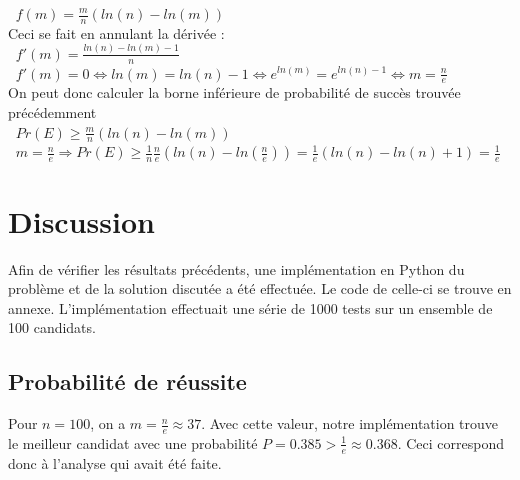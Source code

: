 \documentclass[a4paper,10pt]{article}
\begin{document}
\begin{math}\;\;f(m) = \frac{m}{n} (ln(n) - ln(m))\end{math}\\

Ceci se fait en annulant la dérivée :\\

\begin{math}\;\;f'(m) = \frac{ln(n) - ln(m) - 1}{n}\end{math}\\

\begin{math}\;\;f'(m) = 0 \Leftrightarrow ln(m) = ln(n) - 1\Leftrightarrow e^{ln(m)} = e^{ln(n) - 1}\Leftrightarrow m = \frac{n}{e}\end{math}\\

On peut donc calculer la borne inférieure de probabilité de succès trouvée précédemment\\

\begin{math}\;\; Pr(E) \geq \frac{m}{n} (ln(n) - ln(m))\end{math}\\

\begin{math}\;\; m = \frac{n}{e} \Rightarrow Pr(E) \geq \frac{1}{n} \frac{n}{e}(ln(n) - ln(\frac{n}{e}))
= \frac{1}{e} (ln(n) - ln(n) + 1) = \frac{1}{e}\end{math}\\

\section{Discussion}
Afin de vérifier les résultats précédents, une implémentation en Python du problème et de la solution discutée a été effectuée.
Le code de celle-ci se trouve en annexe. L'implémentation effectuait une série de 1000 tests sur un ensemble de 100 candidats.

\subsection{Probabilité de réussite}
Pour
\begin{math}n = 100\end{math},
on a
\begin{math}m = \frac{n}{e} \approx 37\end{math}.
Avec cette valeur, notre implémentation trouve le meilleur candidat avec
une probabilité
\begin{math}P = 0.385 > \frac{1}{e} \approx 0.368\end{math}.
Ceci correspond donc à l'analyse qui avait été faite.
\end{document}
